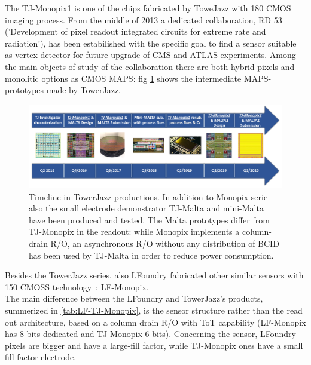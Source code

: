 The TJ-Monopix1 is one of the chips fabricated by ToweJazz with 180 CMOS imaging process. From the middle of 2013 a dedicated collaboration, RD 53 ('Development of pixel readout integrated circuits for extreme rate and radiation'), has been estabilished with the specific goal to find a sensor suitable as vertex detector for future upgrade of CMS and ATLAS experiments. Among the main objects of study of the collaboration there are both hybrid pixels and monolitic options as CMOS MAPS: fig \ref{fig:TJ180nm} shows the intermediate MAPS-prototypes made by TowerJazz.\\
\begin{figure}[h!]
    \centering
    \includegraphics[width=.95\linewidth]{figures/Monopix1/TJ180nm.png}
    \caption{Timeline in TowerJazz productions.  In addition to Monopix serie also the small electrode demonstrator TJ-Malta and mini-Malta have been produced and tested\cite{MALTA}. The Malta prototypes differ from TJ-Monopix in the readout: while Monopix implements a column-drain R/O, an asynchronous R/O without any distribution of BCID has been used by TJ-Malta in order to reduce power consumption.}
    \label{fig:TJ180nm}
\end{figure} 
Besides the TowerJazz series, also LFoundry fabricated other similar sensors with 150 CMOSS technology~\cite{LF-Monopix}\cite{LF-TJ-Monopix}: LF-Monopix.\\
The main difference between the LFoundry and TowerJazz's products, summerized in \ref{tab:LF-TJ-Monopix}, is the sensor structure rather than the read out architecture, based on a column drain R/O with ToT capability (LF-Monopix has 8 bits dedicated and TJ-Monopix 6 bits). Concerning the sensor, LFoundry pixels are bigger and have a large-fill factor, while TJ-Monopix ones have a small fill-factor electrode.

